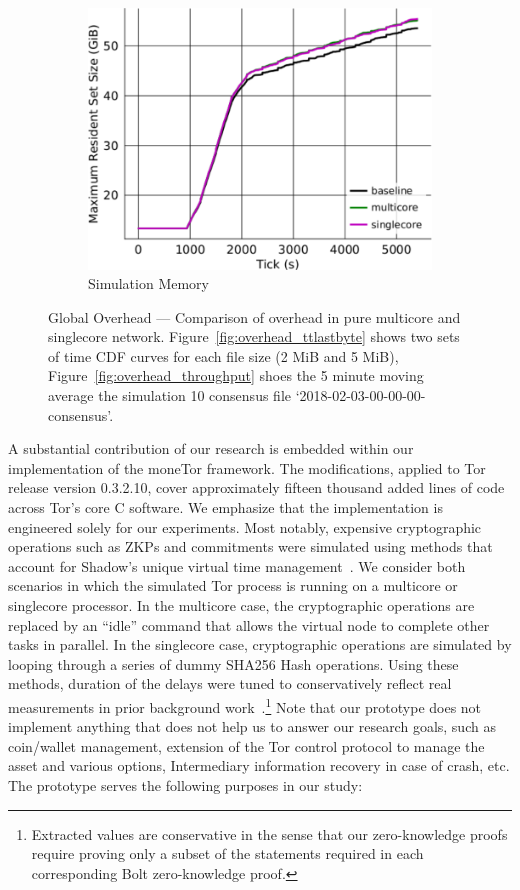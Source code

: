 \begin{figure}[t]
\begin{subfigure}[t]{0.32\textwidth}
    \includegraphics[clip, width=1.0\textwidth]{images/overhead_memory.pdf}
    \caption{Simulation Memory}
    \label{fig:overhead_shadow}
  \end{subfigure}
  \caption{Global Overhead --- Comparison of overhead in pure multicore and singlecore network.
    Figure~\ref{fig:overhead_ttlastbyte} shows two sets of time CDF curves for each file size (2 MiB and 5 MiB), Figure~\ref{fig:overhead_throughput} shoes the 5 minute moving average the simulation 10 consensus file `2018-02-03-00-00-00-consensus'.}
  \label{fig:overhead}
\end{figure}

A substantial contribution of our research is embedded within our implementation of the moneTor framework.
The modifications, applied to Tor release version 0.3.2.10, cover approximately fifteen thousand added lines of code across Tor's core C software.
We emphasize that the implementation is engineered solely for our experiments.
Most notably, expensive cryptographic operations such as ZKPs and commitments were simulated using methods that account for Shadow's unique virtual time management~\cite{jansen2011shadow}.
We consider both scenarios in which the simulated Tor process is running on a multicore or singlecore processor.
In the multicore case, the cryptographic operations are replaced by an ``idle'' command that allows the virtual node to complete other tasks in parallel.
In the singlecore case, cryptographic operations are simulated by looping through a series of dummy SHA256 Hash operations.
Using these methods, duration of the delays were tuned to conservatively reflect real measurements in prior background work~\cite{green2017bolt}.\footnote{Extracted values are conservative in the sense that our zero-knowledge proofs require proving only a subset of the statements required in each corresponding Bolt zero-knowledge proof.}
Note that our prototype does not implement anything that does not help us to answer our research goals, such as coin/wallet management, extension of the Tor control protocol to manage the asset and various options, Intermediary information recovery in case of crash, etc.
The prototype serves the following purposes in our study:

